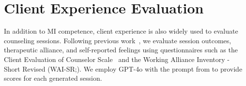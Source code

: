 \section{Client Experience Evaluation}
\label{sec:client evaluation}

In addition to MI competence, client experience is also widely used to evaluate counseling sessions. Following previous work~\citep{wang2024towards}, we evaluate session outcomes, therapeutic alliance, and self-reported feelings using questionnaires such as the Client Evaluation of Counselor Scale~\citep{hamilton2000construct} and the Working Alliance Inventory - Short Revised (WAI-SR;\citep{hatcher2006development}). We employ GPT-4o with the prompt from\citet{wang2024towards} to provide scores for each generated session.


\begin{table}[tb]
\end{table}
